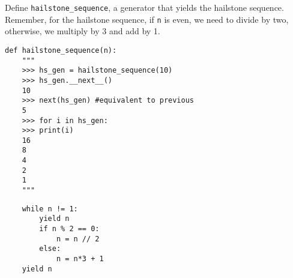 \begin{blocksection}
\question Define \lstinline$hailstone_sequence$, a generator that yields the hailstone sequence. Remember, for the hailstone sequence, if \lstinline$n$ is even, we need to divide by two, otherwise, we multiply by 3 and add by 1.

\begin{lstlisting}
def hailstone_sequence(n):
    """
    >>> hs_gen = hailstone_sequence(10)
    >>> hs_gen.__next__()
    10
    >>> next(hs_gen) #equivalent to previous
    5
    >>> for i in hs_gen:
    >>> print(i)
    16
    8
    4
    2
    1
    """
\end{lstlisting}

\begin{solution}[1.5in]
\begin{lstlisting}
    while n != 1:
        yield n
        if n % 2 == 0:
            n = n // 2
        else:
            n = n*3 + 1
    yield n
\end{lstlisting}
\end{solution}
\end{blocksection}
